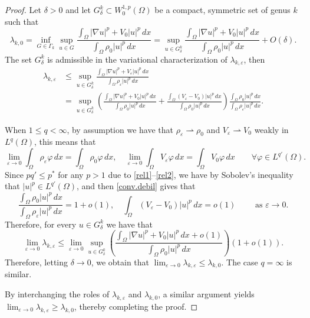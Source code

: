 \documentclass[12pt]{amsart}
\theoremstyle{definition}
\theoremstyle{remark}
\numberwithin{equation}{section}
\begin{document}
\begin{proof}
Let $\delta>0$ and let $G_\delta^k\subset W^{1,p}_0(\Omega)$ be a compact, symmetric set of genus $k$ such that 
$$
\lambda_{k,0} = \inf_{G\in \Gamma_k} \sup_{u\in G} \frac{\int_\Omega |\nabla u|^p + V_0 |u|^p \,dx}{\int_\Omega   \rho_0 |u|^p\,dx} = \sup_{u\in G_\delta^k} \frac{\int_\Omega |\nabla u|^p + V_0|u|^p\,dx}{\int_\Omega   \rho_0 |u|^p\,dx} + O(\delta).
$$
The set $G_\delta^k$ is admissible in the variational characterization of $\lambda_{k,\varepsilon}$, then
\begin{align*}
\lambda_{k,\varepsilon} &\leq \sup_{u\in G_\delta^k} \frac{\int_\Omega |\nabla u|^p  +   V_\varepsilon |u|^p\,dx}{\int_\Omega  \rho_\varepsilon |u|^p\,dx}\\ 
&=  \sup_{u\in G_\delta^k} \left( \frac{\int_\Omega |\nabla u|^p +  V_0 |u|^p \,dx}{\int_\Omega   \rho_0 |u|^p\,dx}  +  \frac{\int_\Omega (V_\varepsilon -  V_0) |u|^p \,dx}{\int_\Omega  \rho_0 |u|^p\,dx} \right)
\frac{\int_\Omega   \rho_0 |u|^p\,dx}{\int_\Omega  \rho_\varepsilon |u|^p\,dx} . 
\end{align*}


When $1\leq q<\infty$, by assumption  we have that $\rho_\varepsilon \rightharpoonup \rho_0$ and $V_\varepsilon \rightharpoonup V_0$ weakly in $L^q(\Omega)$, this means that
\begin{equation} \label{conv.debil}
\lim_{\varepsilon\to 0}\int_\Omega \rho_\varepsilon \varphi \,dx = \int_\Omega \rho_0 \varphi\,dx, \quad \lim_{\varepsilon\to 0}\int_\Omega V_\varepsilon \varphi \,dx = \int_\Omega V_0 \varphi\,dx \qquad \forall \varphi \in L^{q'}(\Omega).
\end{equation}
Since $pq'\leq p^*$  for any $p>1$ due to \eqref{rel1}--\eqref{rel2}, we have by Sobolev's inequality that $|u|^p\in L^{q'}(\Omega)$, and then \eqref{conv.debil} gives that
$$
 \frac{\int_\Omega   \rho_0 |u|^p\,dx}{\int_\Omega  \rho_\varepsilon |u|^p\,dx} =1+ o(1), \quad \int_\Omega (V_\varepsilon -   V_0)|u|^p\,dx = o(1) \qquad \text{ as } \varepsilon \to 0.
$$
Therefore,  for every $u\in G_\delta^k$ we have that
$$
\lim_{\varepsilon\to0}\lambda_{k,\varepsilon}\leq \lim_{\varepsilon\to0}\sup_{u\in G_\delta^k} \left( \frac{\int_\Omega |\nabla u|^p +   V_0 |u|^p \,dx + o(1)  }{\int_\Omega    \rho_0 |u|^p\,dx } \right)(1+o(1)).
$$
Therefore, letting $\delta\to 0$, we obtain that $\lim_{\varepsilon\to 0} \lambda_{k,\varepsilon} \leq \lambda_{k,0}$. The case $q=\infty$ is similar.
 
By interchanging the roles of \(\lambda_{k,\varepsilon}\) and \(\lambda_{k,0}\), a similar argument yields \(\lim_{\varepsilon \to 0} \lambda_{k,\varepsilon} \geq \lambda_{k,0}\), thereby completing the proof.
\end{proof}
\end{document}
